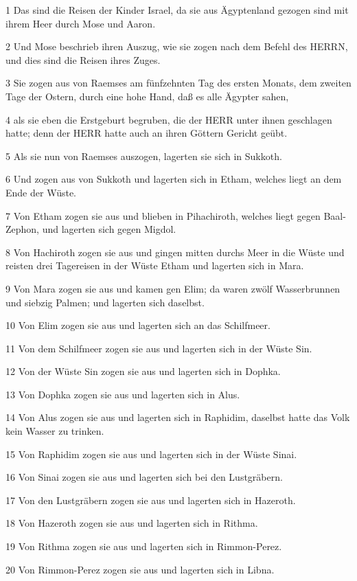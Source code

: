 \par 1 Das sind die Reisen der Kinder Israel, da sie aus Ägyptenland gezogen sind mit ihrem Heer durch Mose und Aaron.
\par 2 Und Mose beschrieb ihren Auszug, wie sie zogen nach dem Befehl des HERRN, und dies sind die Reisen ihres Zuges.
\par 3 Sie zogen aus von Raemses am fünfzehnten Tag des ersten Monats, dem zweiten Tage der Ostern, durch eine hohe Hand, daß es alle Ägypter sahen,
\par 4 als sie eben die Erstgeburt begruben, die der HERR unter ihnen geschlagen hatte; denn der HERR hatte auch an ihren Göttern Gericht geübt.
\par 5 Als sie nun von Raemses auszogen, lagerten sie sich in Sukkoth.
\par 6 Und zogen aus von Sukkoth und lagerten sich in Etham, welches liegt an dem Ende der Wüste.
\par 7 Von Etham zogen sie aus und blieben in Pihachiroth, welches liegt gegen Baal-Zephon, und lagerten sich gegen Migdol.
\par 8 Von Hachiroth zogen sie aus und gingen mitten durchs Meer in die Wüste und reisten drei Tagereisen in der Wüste Etham und lagerten sich in Mara.
\par 9 Von Mara zogen sie aus und kamen gen Elim; da waren zwölf Wasserbrunnen und siebzig Palmen; und lagerten sich daselbst.
\par 10 Von Elim zogen sie aus und lagerten sich an das Schilfmeer.
\par 11 Von dem Schilfmeer zogen sie aus und lagerten sich in der Wüste Sin.
\par 12 Von der Wüste Sin zogen sie aus und lagerten sich in Dophka.
\par 13 Von Dophka zogen sie aus und lagerten sich in Alus.
\par 14 Von Alus zogen sie aus und lagerten sich in Raphidim, daselbst hatte das Volk kein Wasser zu trinken.
\par 15 Von Raphidim zogen sie aus und lagerten sich in der Wüste Sinai.
\par 16 Von Sinai zogen sie aus und lagerten sich bei den Lustgräbern.
\par 17 Von den Lustgräbern zogen sie aus und lagerten sich in Hazeroth.
\par 18 Von Hazeroth zogen sie aus und lagerten sich in Rithma.
\par 19 Von Rithma zogen sie aus und lagerten sich in Rimmon-Perez.
\par 20 Von Rimmon-Perez zogen sie aus und lagerten sich in Libna.
